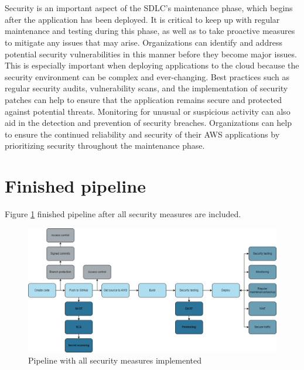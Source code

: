 \\~\\
Security is an important aspect of the SDLC's maintenance phase, which begins after the application has been deployed. It is critical to keep up with regular maintenance and testing during this phase, as well as to take proactive measures to mitigate any issues that may arise. Organizations can identify and address potential security vulnerabilities in this manner before they become major issues. This is especially important when deploying applications to the cloud because the security environment can be complex and ever-changing. Best practices such as regular security audits, vulnerability scans, and the implementation of security patches can help to ensure that the application remains secure and protected against potential threats. Monitoring for unusual or suspicious activity can also aid in the detection and prevention of security breaches. Organizations can help to ensure the continued reliability and security of their AWS applications by prioritizing security throughout the maintenance phase.

\section{Finished pipeline}
Figure \ref{fig: Pipeline with all security measures implemented} finished pipeline after all security measures are included.

\vspace{2mm}
\begin{figure}[H]
    \centering
    \includegraphics[width=0.8\columnwidth]{Images/pipeline9.png}
    \caption{Pipeline with all security measures implemented}
    \label{fig: Pipeline with all security measures implemented}
\end{figure}



